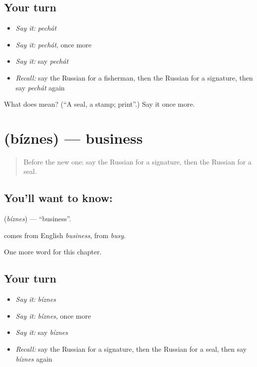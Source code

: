 \subsection*{Your turn}
\begin{itemize}
\raggedright
  \item \emph{Say it:} \emph{pechát}
  \item \emph{Say it:} \emph{pechát}, once more
  \item \emph{Say it:} say \emph{pechát}
  \item \emph{Recall:} say the Russian for a fisherman, then the Russian for a signature, then say \emph{pechát} again
\end{itemize}

\begin{tcolorbox}[breakable,colback=teal!4,colframe=teal!35!black,title={Before you move on}]
What does  mean? (\textquotedblleft{}A seal, a stamp; print\textquotedblright{}.) Say it once more.
\end{tcolorbox}
\section[\texorpdfstring{\ru{бизнес} (bíznes)}{бизнес (bíznes)}]{ (bíznes) — business}

\label{lesson:RU-C203-biznes}



\begin{quote}
Before the new one: say the Russian for a signature, then the Russian for a seal.
\end{quote}

\subsection*{You'll want to know: }
\textbf{} (\emph{bíznes}) — \textquotedblleft{}business\textquotedblright{}.

\begin{cousinweb}
\textbf{} comes from English \emph{business}, from \emph{busy}.
\end{cousinweb}

\begin{grammarlens}[title={What you've built}]
One more word for this chapter.
\end{grammarlens}

\subsection*{Your turn}
\begin{itemize}
\raggedright
  \item \emph{Say it:} \emph{bíznes}
  \item \emph{Say it:} \emph{bíznes}, once more
  \item \emph{Say it:} say \emph{bíznes}
  \item \emph{Recall:} say the Russian for a signature, then the Russian for a seal, then say \emph{bíznes} again
\end{itemize}

